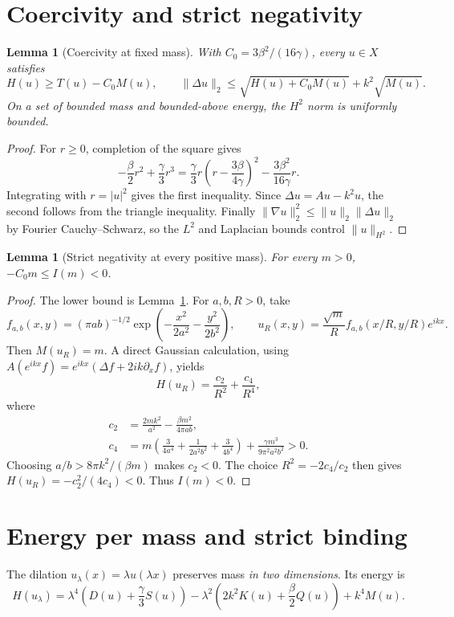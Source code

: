 \documentclass[11pt]{article}
\newtheorem{lemma}[theorem]{Lemma}
\newcommand{\nm}[2]{\lVert #1\rVert_{#2}}
\begin{document}
\section{Coercivity and strict negativity}
\begin{lemma}[Coercivity at fixed mass]\label{lem:coercivity}
With \(C_0=3\beta^2/(16\gamma)\), every \(u\in X\) satisfies
\[
H(u)\ge T(u)-C_0M(u),\qquad
\nm{\Delta u}{2}\le \sqrt{H(u)+C_0M(u)}+k^2\sqrt{M(u)}.
\]
On a set of bounded mass and bounded-above energy, the \(H^2\) norm is
uniformly bounded.
\end{lemma}
\begin{proof}
For \(r\ge0\), completion of the square gives
\[
-\frac\beta2r^2+\frac\gamma3r^3
=\frac\gamma3r\left(r-\frac{3\beta}{4\gamma}\right)^2
-\frac{3\beta^2}{16\gamma}r.
\]
Integrating with \(r=|u|^2\) gives the first inequality. Since
\(\Delta u=Au-k^2u\), the second follows from the triangle inequality.
Finally \(\nm{\nabla u}{2}^2\le\nm{u}{2}\nm{\Delta u}{2}\)
by Fourier Cauchy--Schwarz, so the \(L^2\) and Laplacian bounds control
\(\nm{u}{H^2}\).
\end{proof}

\begin{lemma}[Strict negativity at every positive mass]\label{lem:negative}
For every \(m>0\), \(-C_0m\le I(m)<0\).
\end{lemma}
\begin{proof}
The lower bound is Lemma~\ref{lem:coercivity}. For \(a,b,R>0\), take
\[
f_{a,b}(x,y)=(\pi ab)^{-1/2}
  \exp\left(-\frac{x^2}{2a^2}-\frac{y^2}{2b^2}\right),\qquad
u_R(x,y)=\frac{\sqrt m}{R}f_{a,b}(x/R,y/R)e^{ikx}.
\]
Then \(M(u_R)=m\). A direct Gaussian calculation, using
\(A(e^{ikx}f)=e^{ikx}(\Delta f+2ik\partial_xf)\), yields
\[
H(u_R)=\frac{c_2}{R^2}+\frac{c_4}{R^4},
\]
where
\begin{align*}
c_2&=\frac{2mk^2}{a^2}-\frac{\beta m^2}{4\pi ab},\\
c_4&=m\left(\frac{3}{4a^4}+\frac{1}{2a^2b^2}
+\frac{3}{4b^4}\right)+\frac{\gamma m^3}{9\pi^2a^2b^2}>0.
\end{align*}
Choosing \(a/b>8\pi k^2/(\beta m)\) makes \(c_2<0\). The choice
\(R^2=-2c_4/c_2\) then gives
\(H(u_R)=-c_2^2/(4c_4)<0\). Thus \(I(m)<0\).
\end{proof}

\section{Energy per mass and strict binding}
The dilation \(u_\lambda(x)=\lambda u(\lambda x)\) preserves mass
\emph{in two dimensions}. Its energy is
\begin{equation}\label{eq:dilation}
H(u_\lambda)=\lambda^4\left(D(u)+\frac\gamma3S(u)\right)
-\lambda^2\left(2k^2K(u)+\frac\beta2Q(u)\right)+k^4M(u).
\end{equation}
\end{document}
